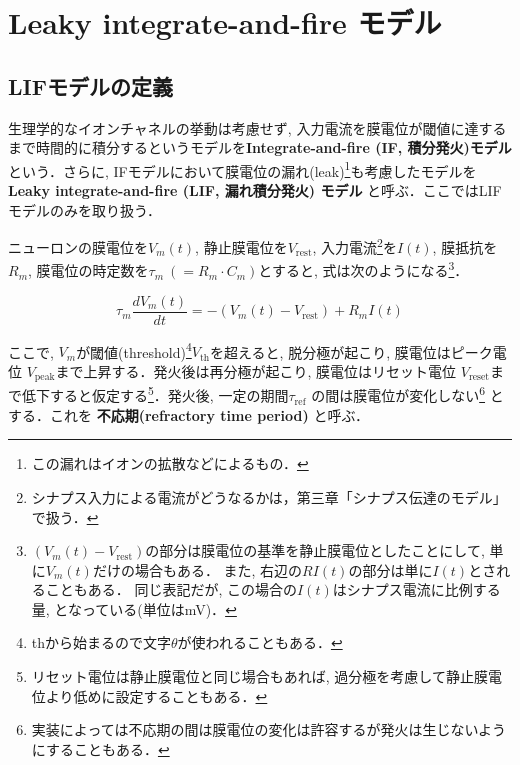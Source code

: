 \section{Leaky integrate-and-fire モデル}
\subsection{LIFモデルの定義}
生理学的なイオンチャネルの挙動は考慮せず, 入力電流を膜電位が閾値に達するまで時間的に積分するというモデルを\textbf{Integrate-and-fire (IF, 積分発火)モデル} という．さらに, IFモデルにおいて膜電位の漏れ(leak)\footnote{この漏れはイオンの拡散などによるもの． }も考慮したモデルを \textbf{Leaky integrate-and-fire (LIF, 漏れ積分発火) モデル} と呼ぶ．ここではLIFモデルのみを取り扱う．

ニューロンの膜電位を$V_m(t)$, 静止膜電位を$V_\text{rest}$, 入力電流\footnote{シナプス入力による電流がどうなるかは，第三章「シナプス伝達のモデル」で扱う．}を$I(t)$, 膜抵抗を$R_m$, 膜電位の時定数を$\tau_m\ (=R_m \cdot C_m)$とすると, 式は次のようになる\footnote{$(V_{m}(t)-V_\text{rest})$の部分は膜電位の基準を静止膜電位としたことにして, 単に$V_m(t)$だけの場合もある． また, 右辺の$RI(t)$の部分は単に$I(t)$とされることもある． 同じ表記だが, この場合の$I(t)$はシナプス電流に比例する量, となっている(単位はmV)． }．


\begin{equation}
\tau_m \frac{dV_{m}(t)}{dt}=-(V_{m}(t)-V_\text{rest})+R_mI(t)
\end{equation}


ここで, $V_m$が閾値(threshold)\footnote{thから始まるので文字$\theta$が使われることもある．}$V_{\text{th}}$を超えると, 脱分極が起こり, 膜電位はピーク電位 $V_{\text{peak}}$まで上昇する．発火後は再分極が起こり, 膜電位はリセット電位 $V_{\text{reset}}$まで低下すると仮定する\footnote{リセット電位は静止膜電位と同じ場合もあれば, 過分極を考慮して静止膜電位より低めに設定することもある．}．発火後, 一定の期間$\tau_{\text{ref}}$ の間は膜電位が変化しない\footnote{実装によっては不応期の間は膜電位の変化は許容するが発火は生じないようにすることもある．} とする．これを \textbf{不応期(refractory time period)} と呼ぶ．

